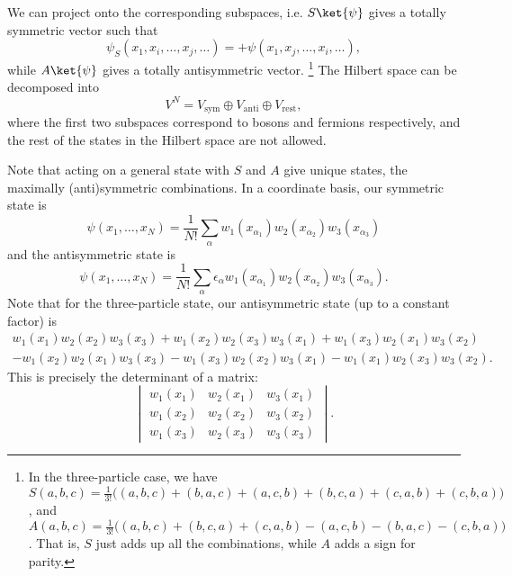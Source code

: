 We can project onto the corresponding subspaces, i.e. $S\ket{\psi}$ gives a totally symmetric vector such that
\begin{equation}
    \psi_S(x_1,x_i, \ldots, x_j, \dots) = + \psi(x_1,x_j,\ldots,x_i,\dots),
\end{equation}
while $A\ket{\psi}$ gives a totally antisymmetric vector.%
    \footnote{In the three-particle case, we have $S(a,b,c) = \frac{1}{3!}\big((a,b,c)+(b,a,c) +(a,c,b) + (b,c,a) + (c,a,b) + (c,b,a) \big)$, and $A(a,b,c) = \frac{1}{3!} \big((a,b,c) +(b,c,a) +(c,a,b)-(a,c,b)-(b,a,c)-(c,b,a)\big)$. That is, $S$ just adds up all the combinations, while $A$ adds a sign for parity.}
The Hilbert space can be decomposed into
\begin{equation}
    V^N = V_\text{sym} \oplus V_\text{anti} \oplus V_\text{rest},
\end{equation}
where the first two subspaces correspond to bosons and fermions respectively, and the rest of the states in the Hilbert space are not allowed.

Note that acting on a general state with $S$ and $A$ give unique states, the maximally (anti)symmetric combinations. In a coordinate basis, our symmetric state is
\begin{equation}
    \psi(x_1,\ldots,x_N) = \frac{1}{N!} \sum_\alpha w_1(x_{\alpha_1}) w_2(x_{\alpha_2}) w_3(x_{\alpha_3})
\end{equation}
and the antisymmetric state is
\begin{equation}
    \psi(x_1,\ldots,x_N) = \frac{1}{N!} \sum_\alpha \epsilon_\alpha w_1(x_{\alpha_1}) w_2(x_{\alpha_2}) w_3(x_{\alpha_3}).
\end{equation}
Note that for the three-particle state, our antisymmetric state (up to a constant factor) is
\begin{multline}
    w_1(x_1) w_2(x_2) w_3(x_3) + w_1(x_2) w_2(x_3) w_3(x_1) + w_1(x_3)w_2(x_1) w_3(x_2)\\
        - w_1(x_2) w_2(x_1) w_3(x_3) - w_1(x_3)w_2(x_2)w_3(x_1) -w_1(x_1)w_2(x_3)w_3(x_2).
\end{multline}
This is precisely the determinant of a matrix:
\begin{equation}
    \begin{vmatrix}
        w_1(x_1) & w_2(x_1) & w_3(x_1)\\
        w_1(x_2) & w_2(x_2) & w_3(x_2)\\
        w_1(x_3) & w_2(x_3) & w_3(x_3)
    \end{vmatrix}.
\end{equation}

